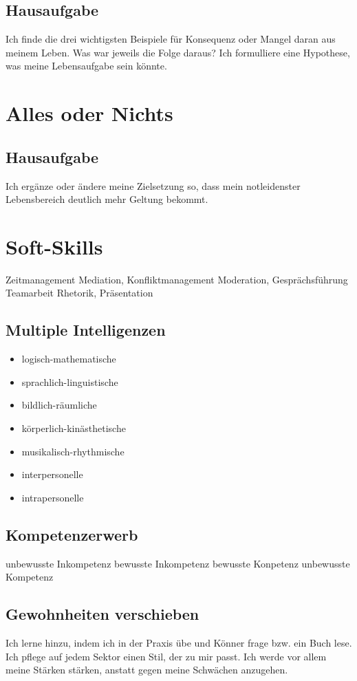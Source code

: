 \subsection*{Hausaufgabe}
Ich finde die drei wichtigsten Beispiele für Konsequenz oder Mangel daran aus meinem Leben.
Was war jeweils die Folge daraus?
Ich formulliere eine Hypothese, was meine Lebensaufgabe sein könnte.

%
%
%
\section{Alles oder Nichts}

\subsection*{Hausaufgabe}
Ich ergänze oder ändere meine Zielsetzung so, dass mein notleidenster Lebensbereich deutlich mehr Geltung bekommt.
%
%
%
\section{Soft-Skills}

Zeitmanagement
Mediation, Konfliktmanagement
Moderation, Gesprächsführung
Teamarbeit
Rhetorik, Präsentation

\subsection{Multiple Intelligenzen}
\begin{itemize}
\item logisch-mathematische
\item sprachlich-linguistische
\item bildlich-räumliche
\item körperlich-kinästhetische
\item musikalisch-rhythmische
\item interpersonelle
\item intrapersonelle
\end{itemize}

\subsection{Kompetenzerwerb}
unbewusste Inkompetenz
bewusste Inkompetenz
bewusste Konpetenz
unbewusste Kompetenz

\subsection*{Gewohnheiten verschieben}
Ich lerne hinzu, indem ich in der Praxis übe und Könner frage bzw. ein Buch lese.
Ich pflege auf jedem Sektor einen Stil, der zu mir passt.
Ich werde vor allem meine Stärken stärken, anstatt gegen meine Schwächen anzugehen.
